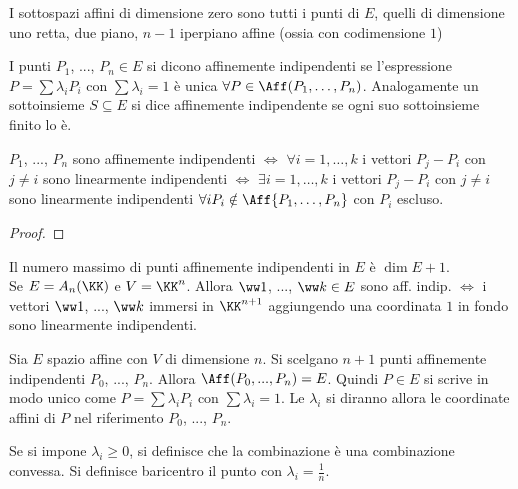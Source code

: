 \documentclass[11pt]{article}
\begin{document}
	\begin{remark}\nl
		\li I sottospazi affini di dimensione zero sono tutti i punti di $E$,
		quelli di dimensione uno retta, due piano, $n-1$ iperpiano affine
		(ossia con codimensione $1$) %
	\end{remark}

	\begin{definition} 
		I punti $P_1$, ..., $P_n \in E$ si dicono affinemente indipendenti se l'espressione $P = \sum \lambda_i P_i$ con $\sum \lambda_i = 1$
		è unica $\forall P \in \Aff(P_1, \ldots, P_n)$. Analogamente
		un sottoinsieme $S \subseteq E$ si dice affinemente indipendente
		se ogni suo sottoinsieme finito lo è.
	\end{definition}

	\begin{proposition}
		$P_1$, ..., $P_n$ sono affinemente indipendenti $\iff$
		$\forall i = 1, \ldots, k$ i vettori $P_j - P_i$ con $j \neq i$
		sono linearmente indipendenti $\iff$ $\exists i = 1, \ldots, k$ i vettori $P_j - P_i$ con $j \neq i$
		sono linearmente indipendenti $\forall i P_i \notin \Aff\{P_1, \ldots, P_n\}$ con $P_i$ escluso.
	\end{proposition}

	\begin{proof}
	\end{proof}

	\begin{remark}\nl
		\li Il numero massimo di punti affinemente indipendenti in $E$ è $\dim E + 1$. \\
		
		\li Se $E = A_n(\KK)$ e $V = \KK^n$. Allora $\ww 1$, ...,
		$\ww k \in E$ sono aff. indip. $\iff$ i vettori $\ww1$, ...,
		$\ww k$ immersi in $\KK^{n+1}$ aggiungendo una coordinata $1$
		in fondo sono linearmente indipendenti.
	\end{remark}

	\begin{remark} Sia $E$ spazio affine con $V$ di dimensione $n$. Si
		scelgano $n+1$ punti affinemente indipendenti $P_0$, ..., $P_n$.
		Allora $\Aff(P_0, ..., P_n) = E$. Quindi $P \in E$ si scrive
		in modo unico come $P = \sum \lambda_i P_i$ con $\sum \lambda_i = 1$.
		Le $\lambda_i$ si diranno allora le coordinate affini di $P$
		nel riferimento $P_0$, ..., $P_n$.
	\end{remark}

	Se si impone $\lambda_i \geq 0$, si definisce che la
	combinazione è una combinazione convessa. Si definisce
	baricentro il punto con $\lambda_i = \frac{1}{n}$.
	
\end{document}
